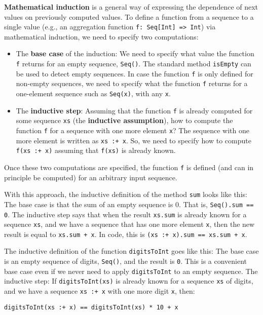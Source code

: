 \textbf{Mathematical induction} is
a general way of expressing the dependence of next values on previously
computed values. To define a function from a sequence to a single
value (e.g., an aggregation function \lstinline!f: Seq[Int] => Int!)
via mathematical induction, we need to specify two computations:
\begin{itemize}
\item \textbf{}The \textbf{base
case} of the induction: We need to specify what value the function
\lstinline!f! returns for an empty sequence, \lstinline!Seq()!.
The standard method \lstinline!isEmpty! can be used to detect empty
sequences. In case the function \lstinline!f! is only defined for
non-empty sequences, we need to specify what the function \lstinline!f!
returns for a one-element sequence such as \lstinline!Seq(x)!, with
any \lstinline!x!.
\item \textbf{}The \textbf{inductive
step}: Assuming that the function \lstinline!f! is already computed
for some sequence \lstinline!xs! (the \textbf{inductive
assumption}), how to compute the function \lstinline!f! for a sequence
with one more element \lstinline!x!? The sequence with one more element
is written as \lstinline!xs :+ x!. So, we need to specify how to
compute \lstinline!f(xs :+ x)! assuming that \lstinline!f(xs)! is
already known.
\end{itemize}
Once these two computations are specified, the function \lstinline!f!
is defined (and can in principle be computed) for an arbitrary input
sequence. %
\begin{comment}
This is how induction works in mathematics, and it works in the same
way in functional programming.
\end{comment}

With this approach, the inductive definition of the method \lstinline!sum!
looks like this: The base case is that the sum of an empty sequence
is $0$. That is, \lstinline!Seq().sum == 0!. The inductive step
says that when the result \lstinline!xs.sum! is already known for
a sequence \lstinline!xs!, and we have a sequence that has one more
element \lstinline!x!, then the new result is equal to \lstinline!xs.sum + x!.
In code, this is \lstinline!(xs :+ x).sum == xs.sum + x!.

The inductive definition of the function \lstinline!digitsToInt!
goes like this: The base case is an empty sequence of digits, \lstinline!Seq()!,
and the result is \lstinline!0!. This is a convenient base case even
if we never need to apply \lstinline!digitsToInt! to an empty sequence.
The inductive step: If \lstinline!digitsToInt(xs)! is already known
for a sequence \lstinline!xs! of digits, and we have a sequence \lstinline!xs :+ x!
with one more digit \lstinline!x!, then:
\begin{lstlisting}
digitsToInt(xs :+ x) == digitsToInt(xs) * 10 + x
\end{lstlisting}

